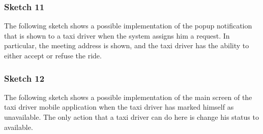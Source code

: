 \subsubsection*{Sketch 11}
{The following sketch shows a possible implementation of the popup notification that is shown to a taxi driver when the system assigns him a request. In particular, the meeting address is shown, and the taxi driver has the ability to either accept or refuse the ride.}
\begin{figure}[H]
\centering
{}
\end{figure}


\subsubsection*{Sketch 12}
{The following sketch shows a possible implementation of the main screen of the taxi driver mobile application when the taxi driver has marked himself as unavailable. The only action that a taxi driver can do here is change his status to available.}
\begin{figure}[H]
\centering
{}
\end{figure}


